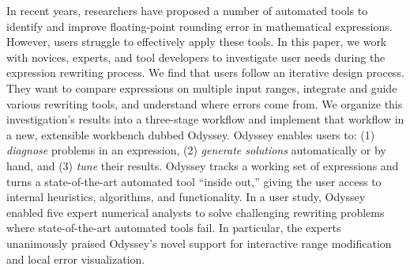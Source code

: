 In recent years, researchers have proposed a number of automated tools to
  identify and improve floating-point rounding error in mathematical expressions.
However, users struggle to effectively apply these tools.
In this paper, we work with 
  novices, experts, and tool developers to 
  investigate user needs during the expression rewriting process.
We find that users follow an iterative design process.
They want to compare expressions on multiple input ranges, 
  integrate and guide various rewriting tools,
  and understand where errors come from.
We organize this investigation's results into a three-stage workflow
  and implement that workflow
  in a new, extensible workbench dubbed Odyssey.
Odyssey enables users to:
  (1) \textit{diagnose} problems in an expression, 
  (2) \textit{generate solutions} automatically or by hand, and 
  (3) \textit{tune} their results. 
Odyssey tracks a working set of expressions
  and turns a state-of-the-art automated tool ``inside out,''
  giving the user access to internal heuristics, algorithms, 
  and functionality.
In a user study, Odyssey enabled five expert numerical analysts
   to solve challenging rewriting problems
  where state-of-the-art automated tools fail.
In particular, the experts unanimously praised Odyssey’s novel support for
  interactive range modification and local error visualization.